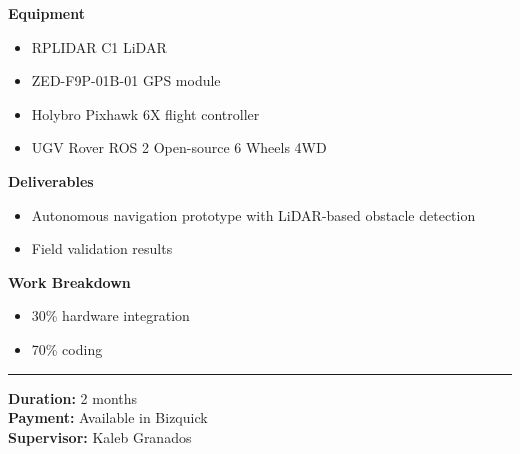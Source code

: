 \documentclass{article}%
\begin{document}
\textbf{Equipment}%
\begin{itemize}[leftmargin=*,itemsep=2pt,topsep=0pt,parsep=0pt,partopsep=0pt]%
\item RPLIDAR C1 LiDAR%
\item ZED{-}F9P{-}01B{-}01 GPS module%
\item Holybro Pixhawk 6X flight controller%
\item UGV Rover ROS 2 Open{-}source 6 Wheels 4WD%
\end{itemize}%
\textbf{Deliverables}%
\begin{itemize}[leftmargin=*,itemsep=2pt,topsep=0pt,parsep=0pt,partopsep=0pt]%
\item Autonomous navigation prototype with LiDAR{-}based obstacle detection%
\item Field validation results%
\end{itemize}%
\textbf{Work Breakdown}%
\begin{itemize}[leftmargin=*,itemsep=2pt,topsep=0pt,parsep=0pt,partopsep=0pt]%
\item 30\% hardware integration%
\item 70\% coding%
\end{itemize}%
\vspace{6pt}\hrule\vspace{8pt}%
\textbf{Duration:} 2 months\\[4pt]%
\textbf{Payment:} Available in Bizquick\\[4pt]%
\textbf{Supervisor:} Kaleb Granados%
\end{document}
